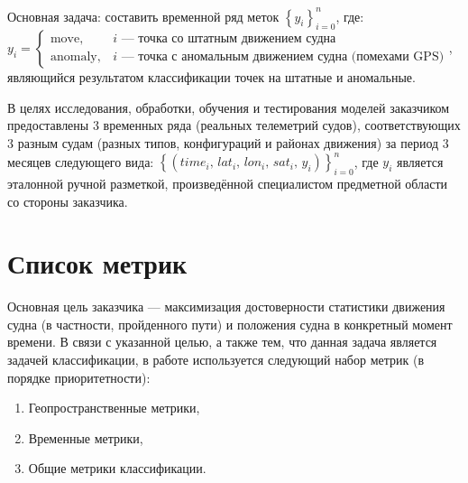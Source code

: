 \documentclass[a4paper,12pt]{report}
\begin{document}
	Основная задача: составить временной ряд меток $\left\{y_i\right\}_{i=0}^{n}$, где:\\
	$y_i =
	\begin{cases}
		\mathrm{move},   & \text{$i$ --- точка со штатным движением судна}\\
		\mathrm{anomaly}, & \text{$i$ --- точка с аномальным движением судна (помехами GPS)}
	\end{cases}$,
	являющийся результатом классификации точек на штатные и аномальные.

	В целях исследования, обработки, обучения и тестирования моделей заказчиком предоставлены 3 временных ряда (реальных телеметрий судов), соответствующих 3 разным судам (разных типов, конфигураций и районах движения) за период 3 месяцев следующего вида:
	$\left\{\left(\mathit{time}_i,\, \mathit{lat}_i,\, \mathit{lon}_i,\, \mathit{sat}_i,\, y_i\right) \right\}_{i=0}^{n}$, где $y_i$ является эталонной ручной разметкой, произведённой специалистом предметной области со стороны заказчика.

	\section{Список метрик}
	Основная цель заказчика --- максимизация достоверности статистики движения судна (в частности, пройденного пути) и положения судна в конкретный момент времени. В связи с указанной целью, а также тем, что данная задача является задачей классификации, в работе используется следующий набор метрик (в порядке приоритетности):
	\begin{enumerate}
		\item Геопространственные метрики,
		\item Временные метрики,
		\item Общие метрики классификации.
	\end{enumerate}
\end{document}
